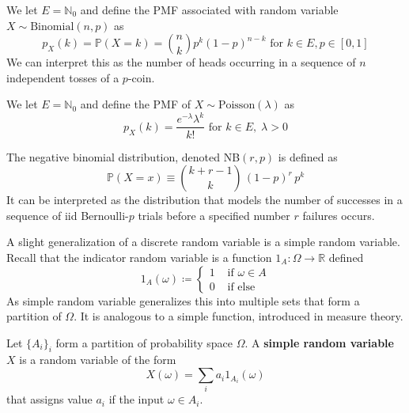     \begin{example}
      We let $E = \mathbb{N}_0$ and define the PMF associated with random variable $X \sim \mathrm{Binomial}(n, p)$ as 
      \begin{equation}
        p_X (k) = \mathbb{P}(X = k) = \binom{n}{k} p^k (1 - p)^{n - k} \text{ for } k \in E, p \in [0, 1]
      \end{equation}
      We can interpret this as the number of heads occurring in a sequence of $n$ independent tosses of a $p$-coin. 
    \end{example}

    \begin{example}
      We let $E = \mathbb{N}_0$ and define the PMF of $X \sim \mathrm{Poisson}(\lambda)$ as 
      \begin{equation}
        p_X (k) = \frac{e^{-\lambda} \lambda^k}{k!} \text{ for } k \in E, \; \lambda > 0
      \end{equation}
    \end{example}

    \begin{definition}
      The negative binomial distribution, denoted NB$(r, p)$ is defined as
      \begin{equation}
        \mathbb{P}(X = x) \equiv \binom{k+r-1}{k} \, (1-p)^r \, p^k
      \end{equation}
      It can be interpreted as the distribution that models the number of successes in a sequence of iid Bernoulli-$p$ trials before a specified number $r$ failures occurs. 
    \end{definition}

    A slight generalization of a discrete random variable is a simple random variable. Recall that the indicator random variable is a function $1_A: \Omega \rightarrow \mathbb{R}$ defined 
    \begin{equation}
      1_A (\omega) \coloneqq \begin{cases} 1 & \text{ if } \omega \in A \\
      0 & \text{ if else } \end{cases}
    \end{equation}
    As simple random variable generalizes this into multiple sets that form a partition of $\Omega$. It is analogous to a simple function, introduced in measure theory. 

    \begin{definition}
      Let $\{A_i\}_i$ form a partition of probability space $\Omega$. A \textbf{simple random variable} $X$ is a random variable of the form 
      \begin{equation}
        X (\omega) = \sum_{i} a_i 1_{A_i} (\omega)
      \end{equation}
      that assigns value $a_i$ if the input $\omega \in A_i$. 
    \end{definition}

